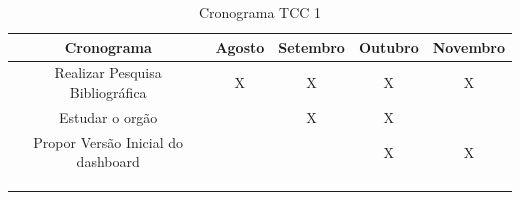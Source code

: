 \begin{table}[http]
	\centering
	\caption{Cronograma TCC 1}
	\label{tab:cronograma}
	\begin{tabular}{ccccc}
		\hline
		\multicolumn{1}{|c|}{\textbf{Cronograma}}             & \multicolumn{1}{c|}{\textbf{Agosto}} & \multicolumn{1}{c|}{\textbf{Setembro}} & \multicolumn{1}{c|}{\textbf{Outubro}} & \multicolumn{1}{c|}{\textbf{Novembro}} \\ \hline
		\multicolumn{1}{|c|}{Realizar Pesquisa Bibliográfica} & \multicolumn{1}{c|}{X}              & \multicolumn{1}{c|}{X}              & \multicolumn{1}{c|}{X}             & \multicolumn{1}{c|}{X}              \\ \hline
		\multicolumn{1}{|c|}{Estudar o orgão}             & \multicolumn{1}{c|}{}               & \multicolumn{1}{c|}{X}              & \multicolumn{1}{c|}{X}             & \multicolumn{1}{c|}{}               \\ \hline
		\multicolumn{1}{|c|}{Propor Versão Inicial do dashboard}                & \multicolumn{1}{c|}{}               & \multicolumn{1}{c|}{}               & \multicolumn{1}{c|}{X}             & \multicolumn{1}{c|}{X}              \\ \hline
		\multicolumn{1}{l}{}                                  & \multicolumn{1}{l}{}                & \multicolumn{1}{l}{}                & \multicolumn{1}{l}{}               & \multicolumn{1}{l}{}                \\
		\multicolumn{1}{l}{}                                  & \multicolumn{1}{l}{}                & \multicolumn{1}{l}{}                & \multicolumn{1}{l}{}               & \multicolumn{1}{l}{}                \\
		\multicolumn{1}{l}{}                                  & \multicolumn{1}{l}{}                & \multicolumn{1}{l}{}                & \multicolumn{1}{l}{}               & \multicolumn{1}{l}{}               
	\end{tabular}
\end{table}
